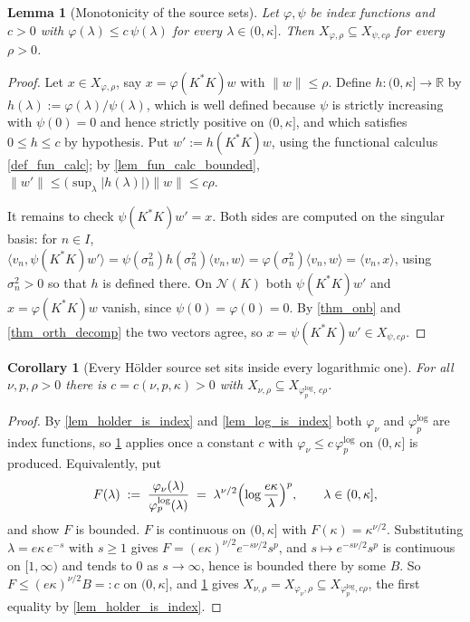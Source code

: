 \documentclass[a4paper]{report}
\theoremstyle{plain}
\newtheorem{lemma}[theorem]{Lemma}
\newtheorem{corollary}[theorem]{Corollary}
\theoremstyle{definition}
\theoremstyle{remark}
\newcommand{\Ker}{\mathcal{N}}
\begin{document}
\begin{lemma}[Monotonicity of the source sets]
  \label{lem_source_monotone}
  Let $\varphi,\psi$ be index functions and $c > 0$ with
  $\varphi(\lambda) \le c\,\psi(\lambda)$ for every $\lambda \in (0,\kappa]$.  Then
  $X_{\varphi,\rho} \subseteq X_{\psi,c\rho}$ for every $\rho > 0$.
\end{lemma}
\begin{proof}
  Let $x \in X_{\varphi,\rho}$, say $x = \varphi(K^{*}K)w$ with $\|w\| \le \rho$.  Define
  $h \colon (0,\kappa] \to \mathbb{R}$ by $h(\lambda) := \varphi(\lambda)/\psi(\lambda)$,
  which is well defined because $\psi$ is strictly increasing with $\psi(0)=0$ and hence
  strictly positive on $(0,\kappa]$, and which satisfies $0 \le h \le c$ by hypothesis.
  Put $w' := h(K^{*}K)w$, using the functional calculus \cref{def_fun_calc}; by
  \cref{lem_fun_calc_bounded}, $\|w'\| \le \bigl(\sup_{\lambda}|h(\lambda)|\bigr)\|w\|
  \le c\rho$.

  It remains to check $\psi(K^{*}K)w' = x$.  Both sides are computed on the singular
  basis: for $n \in I$, $\langle v_n, \psi(K^{*}K)w'\rangle = \psi(\sigma_n^{2})
  h(\sigma_n^{2})\langle v_n,w\rangle = \varphi(\sigma_n^{2})\langle v_n,w\rangle
  = \langle v_n, x\rangle$, using $\sigma_n^{2} > 0$ so that $h$ is defined there.  On
  $\Ker(K)$ both $\psi(K^{*}K)w'$ and $x = \varphi(K^{*}K)w$ vanish, since
  $\psi(0) = \varphi(0) = 0$.  By \cref{thm_onb} and \cref{thm_orth_decomp} the two vectors
  agree, so $x = \psi(K^{*}K)w' \in X_{\psi,c\rho}$.
\end{proof}


\begin{corollary}[Every H\"older source set sits inside every logarithmic one]
  \label{cor_holder_in_log}
  For all $\nu, p, \rho > 0$ there is $c = c(\nu,p,\kappa) > 0$ with
  $X_{\nu,\rho} \subseteq X_{\varphi^{\log}_{p},\,c\rho}$.
\end{corollary}
\begin{proof}
  By \cref{lem_holder_is_index} and \cref{lem_log_is_index} both $\varphi_{\nu}$ and
  $\varphi^{\log}_{p}$ are index functions, so \cref{lem_source_monotone} applies once a
  constant $c$ with $\varphi_{\nu} \le c\,\varphi^{\log}_{p}$ on $(0,\kappa]$ is produced.
  Equivalently, put
  \[
    F(\lambda) \;:=\; \frac{\varphi_{\nu}(\lambda)}{\varphi^{\log}_{p}(\lambda)}
      \;=\; \lambda^{\nu/2}\Bigl(\log\frac{e\kappa}{\lambda}\Bigr)^{p} ,
      \qquad \lambda \in (0,\kappa] ,
  \]
  and show $F$ is bounded.  $F$ is continuous on $(0,\kappa]$ with
  $F(\kappa) = \kappa^{\nu/2}$.  Substituting $\lambda = e\kappa\,e^{-s}$ with
  $s \ge 1$ gives $F = (e\kappa)^{\nu/2}e^{-s\nu/2}s^{p}$, and $s \mapsto e^{-s\nu/2}s^{p}$
  is continuous on $[1,\infty)$ and tends to $0$ as $s \to \infty$, hence is bounded there
  by some $B$.  So $F \le (e\kappa)^{\nu/2}B =: c$ on $(0,\kappa]$, and
  \cref{lem_source_monotone} gives $X_{\nu,\rho} = X_{\varphi_{\nu},\rho} \subseteq
  X_{\varphi^{\log}_p, c\rho}$, the first equality by \cref{lem_holder_is_index}.
\end{proof}
\end{document}
